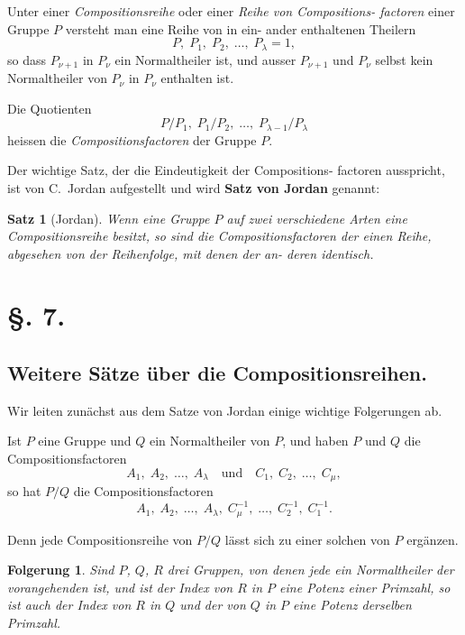 \documentclass[12pt,a4paper]{article}
\theoremstyle{plain}
\newtheorem{satz}{Satz}[section]
\newtheorem{folgerung}{Folgerung}[section]
\theoremstyle{definition}
\theoremstyle{remark}
\begin{document}
Unter einer \emph{Compositionsreihe} oder einer \emph{Reihe von Compositions-
factoren} einer Gruppe $P$ versteht man eine Reihe von in ein-
ander enthaltenen Theilern
\[
P, \; P_1, \; P_2, \; \dots{}, \; P_\lambda = 1,
\]
so dass $P_{\nu+1}$ in $P_\nu$ ein Normaltheiler ist, und ausser $P_{\nu+1}$
und $P_\nu$ selbst kein Normaltheiler von $P_\nu$ in $P_\nu$ enthalten ist.

Die Quotienten
\[
P/P_1, \; P_1/P_2, \; \dots{}, \; P_{\lambda-1}/P_\lambda
\]
heissen die \emph{Compositionsfactoren} der Gruppe $P$.

Der wichtige Satz, der die Eindeutigkeit der Compositions-
factoren ausspricht, ist von C.~Jordan aufgestellt und wird
\textbf{Satz von Jordan} genannt:

\begin{satz}[Jordan]
Wenn eine Gruppe $P$ auf zwei verschiedene Arten eine
Compositionsreihe besitzt, so sind die Compositionsfactoren der
einen Reihe, abgesehen von der Reihenfolge, mit denen der an-
deren identisch.
\end{satz}

\newpage

\section*{\S. 7.}
\subsection*{Weitere Sätze über die Compositionsreihen.}

Wir leiten zunächst aus dem Satze von Jordan einige
wichtige Folgerungen ab.

Ist $P$ eine Gruppe und $Q$ ein Normaltheiler von $P$, und
haben $P$ und $Q$ die Compositionsfactoren
\[
A_1, \; A_2, \; \dots{}, \; A_\lambda \quad \text{und} \quad C_1, \; C_2, \; \dots{}, \; C_\mu,
\]
so hat $P/Q$ die Compositionsfactoren
\[
A_1, \; A_2, \; \dots{}, \; A_\lambda, \; C_\mu^{-1}, \; \dots{}, \; C_2^{-1}, \; C_1^{-1}.
\]

Denn jede Compositionsreihe von $P/Q$ lässt sich zu einer
solchen von $P$ ergänzen.

\begin{folgerung}
Sind $P$, $Q$, $R$ drei Gruppen, von denen jede ein Normaltheiler
der vorangehenden ist, und ist der Index von $R$ in $P$ eine
Potenz einer Primzahl, so ist auch der Index von $R$ in $Q$ und
der von $Q$ in $P$ eine Potenz derselben Primzahl.
\end{folgerung}
\end{document}
